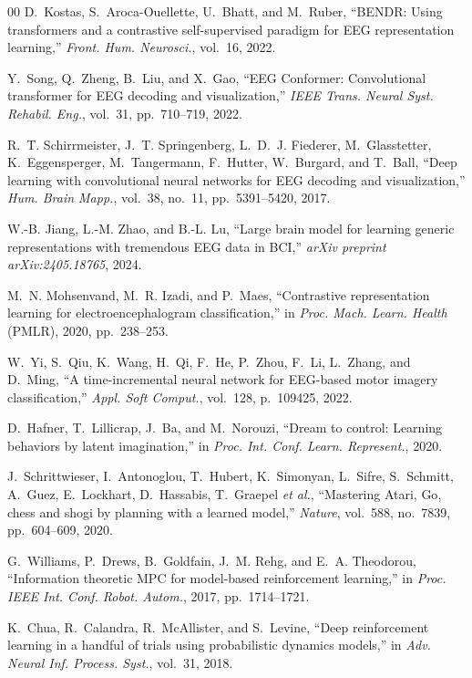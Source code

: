\documentclass[journal]{IEEEtran}
\begin{document}
\begin{thebibliography}{00}
D.~Kostas, S.~Aroca-Ouellette, U.~Bhatt, and M.~Ruber, ``{BENDR}: Using transformers and a contrastive self-supervised paradigm for {EEG} representation learning,'' \emph{Front. Hum. Neurosci.}, vol.~16, 2022.

Y.~Song, Q.~Zheng, B.~Liu, and X.~Gao, ``{EEG} Conformer: Convolutional transformer for {EEG} decoding and visualization,'' \emph{IEEE Trans. Neural Syst. Rehabil. Eng.}, vol.~31, pp.~710--719, 2022.

R.~T. Schirrmeister, J.~T. Springenberg, L.~D.~J. Fiederer, M.~Glasstetter, K.~Eggensperger, M.~Tangermann, F.~Hutter, W.~Burgard, and T.~Ball, ``Deep learning with convolutional neural networks for {EEG} decoding and visualization,'' \emph{Hum. Brain Mapp.}, vol.~38, no.~11, pp.~5391--5420, 2017.

W.-B. Jiang, L.-M. Zhao, and B.-L. Lu, ``Large brain model for learning generic representations with tremendous {EEG} data in {BCI},'' \emph{arXiv preprint arXiv:2405.18765}, 2024.

M.~N. Mohsenvand, M.~R. Izadi, and P.~Maes, ``Contrastive representation learning for electroencephalogram classification,'' in \emph{Proc. Mach. Learn. Health} (PMLR), 2020, pp.~238--253.

W.~Yi, S.~Qiu, K.~Wang, H.~Qi, F.~He, P.~Zhou, F.~Li, L.~Zhang, and D.~Ming, ``A time-incremental neural network for {EEG}-based motor imagery classification,'' \emph{Appl. Soft Comput.}, vol.~128, p.~109425, 2022.

D.~Hafner, T.~Lillicrap, J.~Ba, and M.~Norouzi, ``Dream to control: Learning behaviors by latent imagination,'' in \emph{Proc. Int. Conf. Learn. Represent.}, 2020.

J.~Schrittwieser, I.~Antonoglou, T.~Hubert, K.~Simonyan, L.~Sifre, S.~Schmitt, A.~Guez, E.~Lockhart, D.~Hassabis, T.~Graepel \emph{et al.}, ``Mastering {Atari}, {Go}, chess and shogi by planning with a learned model,'' \emph{Nature}, vol.~588, no.~7839, pp.~604--609, 2020.

G.~Williams, P.~Drews, B.~Goldfain, J.~M. Rehg, and E.~A. Theodorou, ``Information theoretic {MPC} for model-based reinforcement learning,'' in \emph{Proc. IEEE Int. Conf. Robot. Autom.}, 2017, pp.~1714--1721.

K.~Chua, R.~Calandra, R.~McAllister, and S.~Levine, ``Deep reinforcement learning in a handful of trials using probabilistic dynamics models,'' in \emph{Adv. Neural Inf. Process. Syst.}, vol.~31, 2018.


\end{thebibliography}
\end{document}
